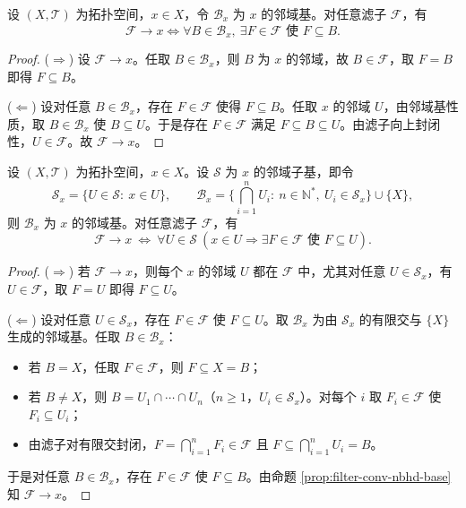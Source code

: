 \documentclass[lang=cn,a4paper,newtx,figureplace=section,tableplace=section]{elegantbook}
\begin{document}
  
  \begin{proposition}[滤子收敛的邻域基刻画]\label{prop:filter-conv-nbhd-base}
  设 $(X,\mathcal T)$ 为拓扑空间，$x\in X$，令 $\mathcal B_x$ 为 $x$ 的邻域基。对任意滤子 $\mathcal F$，有
  \[
  \mathcal F\to x \Longleftrightarrow \forall B\in\mathcal B_x,\ \exists F\in\mathcal F\text{ 使 }F\subseteq B.
  \]
  \end{proposition}
  \begin{proof}
  ($\Rightarrow$) 设 $\mathcal F\to x$。任取 $B\in\mathcal B_x$，则 $B$ 为 $x$ 的邻域，故 $B\in\mathcal F$，取 $F=B$ 即得 $F\subseteq B$。
  
  ($\Leftarrow$) 设对任意 $B\in\mathcal B_x$，存在 $F\in\mathcal F$ 使得 $F\subseteq B$。任取 $x$ 的邻域 $U$，由邻域基性质，取 $B\in\mathcal B_x$ 使 $B\subseteq U$。于是存在 $F\in\mathcal F$ 满足 $F\subseteq B\subseteq U$。由滤子向上封闭性，$U\in\mathcal F$。故 $\mathcal F\to x$。
  \end{proof}
  
  \begin{proposition}[滤子收敛的邻域子基刻画]\label{prop:filter-conv-subnbhd}
  设 $(X,\mathcal T)$ 为拓扑空间，$x\in X$。设 $\mathcal S$ 为 $x$ 的邻域子基，即令
  \[
  \mathcal S_x=\{U\in\mathcal S:\ x\in U\},\qquad
  \mathcal B_x=\Big\{\bigcap_{i=1}^n U_i:\ n\in\mathbb N^*,\ U_i\in\mathcal S_x\Big\}\cup\{X\},
  \]
  则 $\mathcal B_x$ 为 $x$ 的邻域基。对任意滤子 $\mathcal F$，有
  \[
  \mathcal F\to x\ \Longleftrightarrow\ \forall U\in\mathcal S\ (x\in U\Rightarrow \exists F\in\mathcal F\text{ 使 }F\subseteq U).
  \]
  \end{proposition}
  \begin{proof}
  ($\Rightarrow$) 若 $\mathcal F\to x$，则每个 $x$ 的邻域 $U$ 都在 $\mathcal F$ 中，尤其对任意 $U\in\mathcal S_x$，有 $U\in\mathcal F$，取 $F=U$ 即得 $F\subseteq U$。
  
  ($\Leftarrow$) 设对任意 $U\in\mathcal S_x$，存在 $F\in\mathcal F$ 使 $F\subseteq U$。取 $\mathcal B_x$ 为由 $\mathcal S_x$ 的有限交与 $\{X\}$ 生成的邻域基。任取 $B\in\mathcal B_x$：
  \begin{itemize}
    \item 若 $B=X$，任取 $F\in\mathcal F$，则 $F\subseteq X=B$；
    \item 若 $B\ne X$，则 $B=U_1\cap\cdots\cap U_n$（$n\ge1$，$U_i\in\mathcal S_x$）。对每个 $i$ 取 $F_i\in\mathcal F$ 使 $F_i\subseteq U_i$；
    \item 由滤子对有限交封闭，$F=\bigcap_{i=1}^n F_i\in\mathcal F$ 且 $F\subseteq\bigcap_{i=1}^n U_i=B$。
  \end{itemize}
  于是对任意 $B\in\mathcal B_x$，存在 $F\in\mathcal F$ 使 $F\subseteq B$。由命题 \ref{prop:filter-conv-nbhd-base} 知 $\mathcal F\to x$。
  \end{proof}
  
\end{document}

